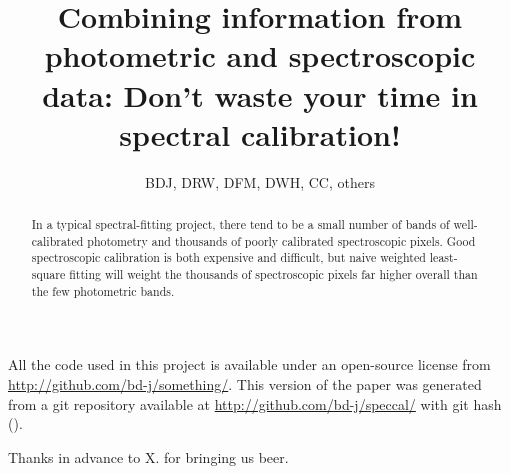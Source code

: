 \documentclass[iop,numberedappendix]{emulateapj}
\begin{document}
\title{Combining information from photometric and spectroscopic data:
  Don't waste your time in spectral calibration!}
\author{BDJ, DRW, DFM, DWH, CC, others}

\begin{abstract}
In a typical spectral-fitting project,
  there tend to be a small number of bands of well-calibrated photometry
  and thousands of poorly calibrated spectroscopic pixels.
Good spectroscopic calibration is both expensive and difficult,
  but naive weighted least-square fitting will weight
  the thousands of spectroscopic pixels far higher overall
  than the few photometric bands.
\end{abstract}


All the code used in this project is available under an open-source license
  from \url{http://github.com/bd-j/something/}.
This version of the paper was generated
  from a git repository available at \url{http://github.com/bd-j/speccal/}
  with git hash \texttt{\githash} (\gitdate).

\acknowledgements
Thanks in advance to X. for bringing us beer.
\end{document}
